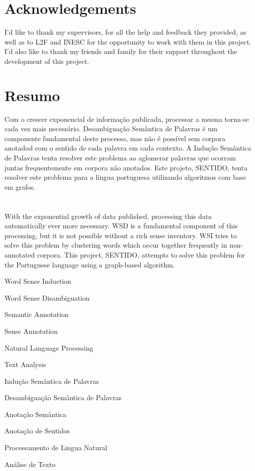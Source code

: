 \cleardoublepage
\chapter*{Acknowledgements}
I'd like to thank my supervisors, for all the help and feedback they provided, as well as to L2F and
INESC for the opportunity to work with them in this project. I'd also like to thank my friends and
family for their support throughout the development of this project.

\cleardoublepage
\chapter*{Resumo}
Com o crescer exponencial de informação publicada, processar a mesma torna-se
cada vez mais necessário. Desambiguação Semântica de Palavras é um componente
fundamental deste processo, mas não é possível sem corpora anotadod com o
sentido de cada palavra em cada contexto. A Indução Semântica de Palavras tenta
resolver este problema ao aglomerar palavras que ocorram juntas frequentemente
em corpora não anotados. Este projeto, \acf*{SENTIDO}, tenta resolver este
problema para a língua portuguesa utilizando algoritmos com base em grafos.

\cleardoublepage
\chapter*{\abstractname}
With the exponential growth of data published, processing this data
automatically ever more necessary. \acf*{WSD} is a fundamental component of this
processing, but it is not possible without a rich sense inventory. \acf*{WSI}
tries to solve this problem by clustering words which occur together frequently
in non-annotated corpora. This project, \acf*{SENTIDO}, attempts to solve this
problem for the Portuguese language using a graph-based algorithm.

\cleardoublepage
{}
\begin{keywords}
Word Sense Induction

Word Sense Disambiguation

Semantic Annotation

Sense Annotation

Natural Language Processing

Text Analysis

\bigskip
\bigskip
Indução Semântica de Palavras

Desambiguação Semântica de Palavras

Anotação Semântica

Anotação de Sentidos

Processamento de Lingua Natural

Análise de Texto

\end{keywords}

